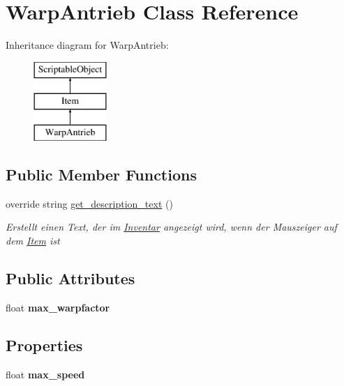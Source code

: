 \hypertarget{class_warp_antrieb}{}\section{Warp\+Antrieb Class Reference}
\label{class_warp_antrieb}
Inheritance diagram for Warp\+Antrieb\+:\begin{figure}[H]
\begin{center}
\leavevmode
\includegraphics[height=3.000000cm]{class_warp_antrieb}
\end{center}
\end{figure}
\subsection*{Public Member Functions}
\begin{DoxyCompactItemize}
\item 
override string \hyperlink{class_warp_antrieb_a6fab9b91e972d0411541b2a2ff89a21e}{get\+\_\+description\+\_\+text} ()
\begin{DoxyCompactList}\small\item\em Erstellt einen Text, der im \hyperlink{class_inventar}{Inventar} angezeigt wird, wenn der Mauszeiger auf dem \hyperlink{class_item}{Item} ist \end{DoxyCompactList}\end{DoxyCompactItemize}
\subsection*{Public Attributes}
\begin{DoxyCompactItemize}
\item 
\mbox{\label{class_warp_antrieb_a77b5e760d5d7d0ccdd74c99c51c04702}} 
float {\bfseries max\+\_\+warpfactor}
\end{DoxyCompactItemize}
\subsection*{Properties}
\begin{DoxyCompactItemize}
\item 
\mbox{\label{class_warp_antrieb_a2d031331c701d995881cd473169e3e3b}} 
float {\bfseries max\+\_\+speed}
\end{DoxyCompactItemize}
